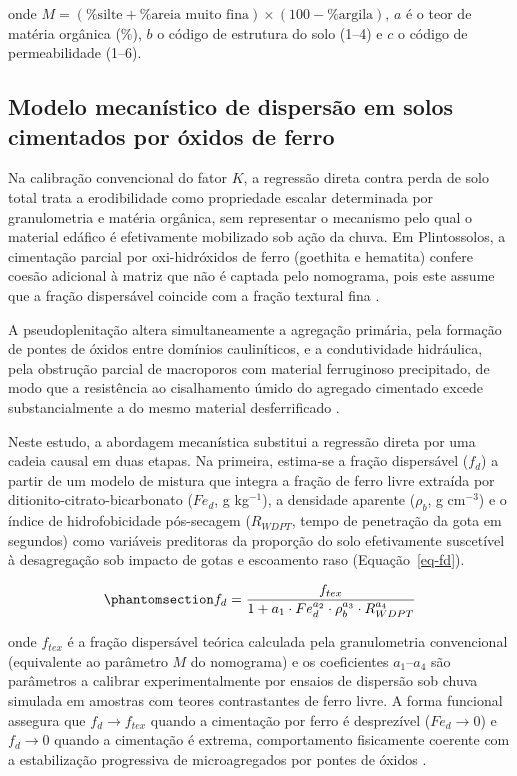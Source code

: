\documentclass[
  brazilian,
  authoryear,
  preprint]{elsarticle}
\begin{document}
onde
\(M = (\%\text{silte} + \%\text{areia muito fina}) \times (100 - \%\text{argila})\),
\(a\) é o teor de matéria orgânica (\%), \(b\) o código de estrutura do
solo (1--4) e \(c\) o código de permeabilidade (1--6).

\subsection{Modelo mecanístico de dispersão em solos cimentados por
óxidos de
ferro}\label{modelo-mecanuxedstico-de-dispersuxe3o-em-solos-cimentados-por-uxf3xidos-de-ferro}

Na calibração convencional do fator \(K\), a regressão direta contra
perda de solo total trata a erodibilidade como propriedade escalar
determinada por granulometria e matéria orgânica, sem representar o
mecanismo pelo qual o material edáfico é efetivamente mobilizado sob
ação da chuva. Em Plintossolos, a cimentação parcial por oxi-hidróxidos
de ferro (goethita e hematita) confere coesão adicional à matriz que não
é captada pelo nomograma, pois este assume que a fração dispersável
coincide com a fração textural fina \citep{alewell_et_al_2019}.

A pseudoplenitação altera simultaneamente a agregação primária, pela
formação de pontes de óxidos entre domínios cauliníticos, e a
condutividade hidráulica, pela obstrução parcial de macroporos com
material ferruginoso precipitado, de modo que a resistência ao
cisalhamento úmido do agregado cimentado excede substancialmente a do
mesmo material desferrificado \citep{silva_et_al_2009}.

Neste estudo, a abordagem mecanística substitui a regressão direta por
uma cadeia causal em duas etapas. Na primeira, estima-se a fração
dispersável (\(f_d\)) a partir de um modelo de mistura que integra a
fração de ferro livre extraída por ditionito-citrato-bicarbonato
(\(Fe_d\), g kg\(^{-1}\)), a densidade aparente (\(\rho_b\), g
cm\(^{-3}\)) e o índice de hidrofobicidade pós-secagem (\(R_{WDPT}\),
tempo de penetração da gota em segundos) como variáveis preditoras da
proporção do solo efetivamente suscetível à desagregação sob impacto de
gotas e escoamento raso (Equação~\ref{eq-fd}).

\begin{equation}\phantomsection\label{eq-fd}{
f_d = \dfrac{f_{tex}}{1 + a_1 \cdot Fe_d^{a_2} \cdot \rho_b^{a_3} \cdot R_{WDPT}^{a_4}}
}\end{equation}

onde \(f_{tex}\) é a fração dispersável teórica calculada pela
granulometria convencional (equivalente ao parâmetro \(M\) do nomograma)
e os coeficientes \(a_1\)--\(a_4\) são parâmetros a calibrar
experimentalmente por ensaios de dispersão sob chuva simulada em
amostras com teores contrastantes de ferro livre. A forma funcional
assegura que \(f_d \to f_{tex}\) quando a cimentação por ferro é
desprezível (\(Fe_d \to 0\)) e \(f_d \to 0\) quando a cimentação é
extrema, comportamento fisicamente coerente com a estabilização
progressiva de microagregados por pontes de óxidos
\citep{bertoni_lombardi_neto_2017}.
\end{document}
